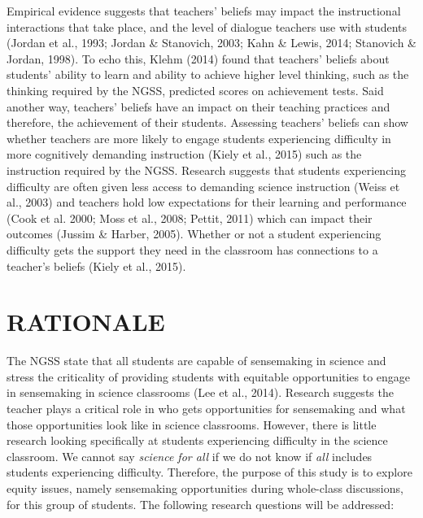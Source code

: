 \documentclass{sig-alternate} %
\begin{document}
\begin{large}
Empirical evidence suggests that teachers’ beliefs may impact the instructional interactions that take place, and the level of dialogue teachers use with students (Jordan et al., 1993; Jordan \& Stanovich, 2003; Kahn \& Lewis, 2014; Stanovich \& Jordan, 1998). To echo this, Klehm (2014) found that teachers’ beliefs about students’ ability to learn and ability to achieve higher level thinking, such as the thinking required by the NGSS, predicted scores on achievement tests. Said another way, teachers’ beliefs have an impact on their teaching practices and therefore, the achievement of their students. Assessing teachers’ beliefs can show whether teachers are more likely to engage students experiencing difficulty in more cognitively demanding instruction (Kiely et al., 2015) such as the instruction required by the NGSS. Research suggests that students experiencing difficulty are often given less access to demanding science instruction (Weiss et al., 2003) and teachers hold low expectations for their learning and performance (Cook et al. 2000; Moss et al., 2008; Pettit, 2011) which can impact their outcomes (Jussim \& Harber, 2005). Whether or not a student experiencing difficulty gets the support they need in the classroom has connections to a teacher’s beliefs (Kiely et al., 2015).

\section*{RATIONALE}

The NGSS state that all students are capable of sensemaking in science and stress the criticality of providing students with equitable opportunities to engage in sensemaking in science classrooms (Lee et al., 2014). Research suggests the teacher plays a critical role in who gets opportunities for sensemaking and what those opportunities look like in science classrooms.  However, there is little research looking specifically at students experiencing difficulty in the science classroom. We cannot say \textit{science for all} if we do not know if \textit{all} includes students experiencing difficulty. Therefore, the purpose of this study is to explore equity issues, namely sensemaking opportunities during whole-class discussions, for this group of students. The following research questions will be addressed: 



\end{large}
\end{document}
